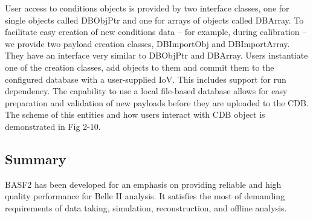  User access to conditions objects is
provided by two interface classes, one for single objects
called DBObjPtr and one for arrays of objects called
DBArray. To facilitate easy creation of new conditions data – for example, during calibration – we provide two payload creation classes, DBImportObj and DBImportArray. They
have an interface very similar to DBObjPtr and DBArray. \cite{BASF2}
Users instantiate one of the creation classes, add objects
 to them and commit them to the configured database with a user-supplied IoV. This includes support for run dependency. The capability to use a local file-based
 database allows for easy preparation and validation of
new payloads before they are uploaded to the CDB. The scheme of this entities and how users interact with CDB object is demonstrated in Fig 2-10.

\subsection{Summary}
BASF2 has been developed for an emphasis on providing reliable and high quality performance for Belle II analysis. It satisfies the most of demanding requirements of data taking, simulation, reconstruction, and offline analysis. 








